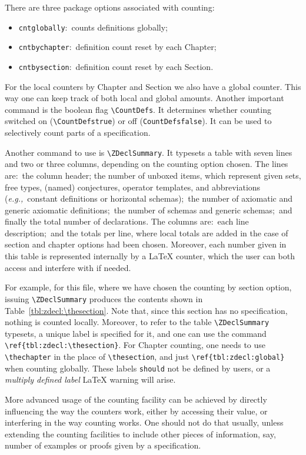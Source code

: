 \documentclass{article}
\begin{document}
There are three package options associated with counting:
%
\begin{itemize}
   \item \texttt{cntglobally}:~counts definitions globally;
   \item \texttt{cntbychapter}:~definition count reset by each Chapter;
   \item \texttt{cntbysection}:~definition count reset by each Section.
\end{itemize}
%
For the local counters by Chapter and Section we also have a global counter.
This way one can keep track of both local and global amounts. Another important
command is the boolean flag \verb|\CountDefs|. It determines whether counting
switched on (\verb|\CountDefstrue|) or off (\verb|CountDefsfalse|). It can be
used to selectively count parts of a specification.

Another command to use is \verb|\ZDeclSummary|. It typesets a table
with seven lines and two or three columns, depending on the counting 
option chosen. The lines are:~the column header; the number of 
unboxed items, which represent given sets, free types, (named) conjectures,
operator templates, and abbreviations (\textit{e.g.,}~constant definitions 
or horizontal schemas);~the number of axiomatic and generic axiomatic 
definitions;~the number of schemas and generic schemas;~and finally the
total number of declarations. The columns are:~each line description;~and 
the totals per line, where local totals are added in the case of section
and chapter options had been chosen. Moreover, each number given in this 
table is represented internally by a \LaTeX{} counter, which the user can 
both access and interfere with if needed. 

For example, for this file, where we have chosen the counting by section option, 
issuing \verb|\ZDeclSummary| produces the contents shown in Table~\ref{tbl:zdecl:\thesection}.
%
\ZDeclSummary
%
Note that, since this section has no specification, nothing is counted locally.
Moreover, to refer to the table \verb|\ZDeclSummary| typesets, a unique label
is specified for it, and one can use the command \verb|\ref{tbl:zdecl:\thesection}|.
For Chapter counting, one needs to use \verb|\thechapter| in the place of \verb|\thesection|,
and just \verb|\ref{tbl:zdecl:global}| when counting globally. These labels \texttt{should}
not be defined by users, or a \textit{multiply defined label} \LaTeX{} warning will arise.

More advanced usage of the counting facility can be achieved by directly
influencing the way the counters work, either by accessing their value,
or interfering in the way counting works. One should not do that usually,
unless extending the counting facilities to include other pieces of information,
say, number of examples or proofs given by a specification.
\end{document}
